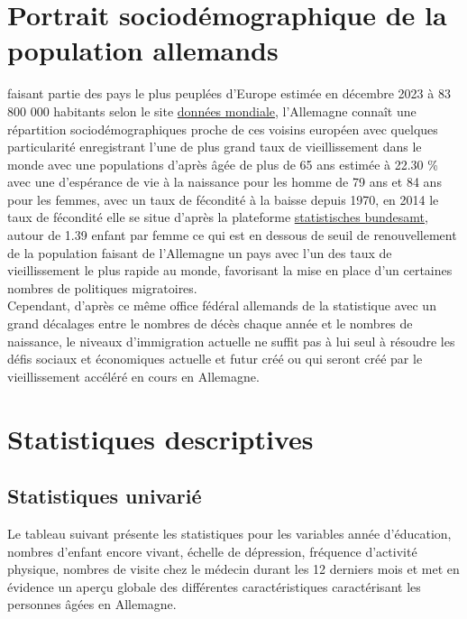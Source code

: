 \documentclass[a4paper]{article}
\begin{document}
	\section{Portrait sociodémographique de la population allemands}  
	 
	faisant partie des pays le plus peuplées d’Europe estimée en décembre 2023 à 83 800 000 habitants selon le site \href{https://www.donneesmondiales.com/}{données mondiale}, l'Allemagne connaît une répartition sociodémographiques proche de ces voisins européen avec quelques particularité enregistrant l’une de plus grand taux de vieillissement dans le monde avec une populations d’après \citep{Lestrade2016} âgée de plus de 65 ans estimée à 22.30 \% avec une d'espérance de vie à la naissance pour les homme de 79 ans et 84 ans pour les femmes, avec un taux de fécondité à la baisse depuis 1970, en 2014 le taux de fécondité elle se situe d’après la plateforme \href{https://www.destatis.de/DE/Home/_inhalt.html}{statistisches bundesamt}, autour de 1.39 enfant par femme ce qui est en dessous de seuil de renouvellement de la population  faisant de l’Allemagne un pays avec l’un des taux de vieillissement le plus rapide au monde, favorisant la mise en place d’un certaines nombres de politiques migratoires.\\
	Cependant, d’après ce même office fédéral allemands de la statistique avec un grand décalages entre le nombres de décès chaque année et le nombres de naissance, le niveaux d’immigration actuelle ne suffit pas à lui seul à résoudre les défis sociaux et économiques actuelle et futur créé ou qui seront créé par le vieillissement accéléré en cours en Allemagne.  
	
	\section{Statistiques descriptives}          
	
	\subsection{Statistiques univarié}
	 
	Le tableau suivant présente les statistiques pour les variables année d'éducation, nombres d’enfant encore vivant, échelle de dépression, fréquence d’activité physique, nombres de visite chez le  médecin durant les 12 derniers mois et met en évidence un aperçu globale des différentes caractéristiques caractérisant les personnes âgées en Allemagne.
	
\end{document}
